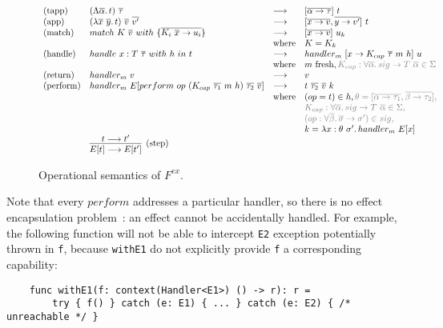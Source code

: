 \documentclass[acmsmall]{acmart}
\newcommand{\ap}{~}
\begin{document}
\begin{figure}
    \[
        \begin{array}{llll}
            \text{(tapp)} &(\Lambda \overline{\alpha}\ldotp t) \ap \overline{\tau} &\longrightarrow &[\overline{\alpha\to\tau}]\ap t
            \\
            \text{(app)} &(\lambda \overline{x}~\overline{y}\ldotp t) \ap \overline{v} \ap \overline{v'} &\longrightarrow &[\overline{x\to v}, \overline{y\to v'}]\ap t
            \\
            \text{(match)} &match ~K \ap \overline{v}~ with ~ \{ \overline{K_i \ap \overline{x} \to u_i}\} &\longrightarrow &[\overline{x\to v}]\ap u_k
            \\
            &&\text{where} & K = K_k
            \\
            \text{(handle)} &handle ~ x : T \ap \overline{\tau} ~with~h~in~t &\longrightarrow & handler_m ~[x \to K_{cap} \ap\overline{\tau}\ap m \ap h] \ap u
            \\
            &&\text{where} & m \text{ fresh}, {\color{gray}K_{cap} : \forall\overline{\alpha}\ldotp sig\to T\ap\overline{\alpha} \in \Sigma}
            \\
            \text{(return)} &handler_m ~v &\longrightarrow & v
            \\
            \text{(perform)} &handler_m~E[perform \ap op \ap (K_{cap}\ap\overline{\tau_1}\ap m \ap h)\ap\overline{\tau_2}\ap\overline{v}] &\longrightarrow &t \ap \overline{\tau_2}\ap \overline{v}\ap k
            \\
            &&\text{where} & (op = t) \in h, {\color{gray}\theta = [\overline{\alpha\to\tau_1}, \overline{\beta\to\tau_2}],} \\
            &&& {\color{gray}K_{cap} : \forall\overline{\alpha}\ldotp sig\to T\ap\overline{\alpha} \in \Sigma,} \\
            &&& {\color{gray}(op : \forall\overline{\beta}\ldotp\overline{\sigma}\to\sigma') \in sig,} \\
            &&& k = \lambda x : \theta\ap\sigma' \ldotp handler_m~E[x] \\
            & \infer[\text{(step)}]{E[t]\longrightarrow E[t']}{t\longrightarrow t'} &&
        \end{array}
    \]
    \caption{Operational semantics of $F^{ex}$.} %
    \label{fig:fex-operational}
\end{figure}

Note that every $perform$ addresses a particular handler, so there is no effect encapsulation problem~\cite{lindley2018encapsulating}: an effect cannot be accidentally handled. %
For example, the following function will not be able to intercept \texttt{E2} exception potentially thrown in \texttt{f}, because \texttt{withE1} do not explicitly provide \texttt{f} a corresponding capability:
\begin{verbatim}
    func withE1(f: context(Handler<E1>) () -> r): r =
        try { f() } catch (e: E1) { ... } catch (e: E2) { /* unreachable */ }
\end{verbatim}
\end{document}
